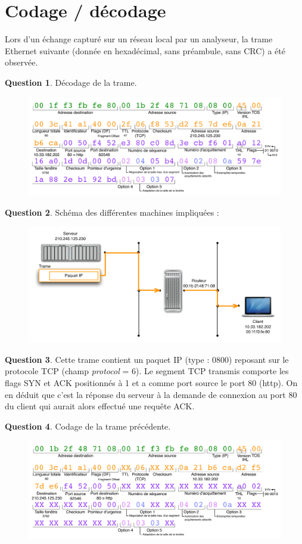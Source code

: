 \documentclass[11pt,english,french]{scrreprt}
\theoremstyle{remark}
\theoremstyle{definition}
\newtheorem{ques}{Question}[section]
\begin{document}
\section{Codage / décodage} %

Lors d'un échange capturé sur un réseau local par un analyseur, la trame Ethernet suivante (donnée en hexadécimal, sans préambule, sans CRC) a été observée.

\begin{ques}
	Décodage de la trame.
	\begin{figure}[h]
		\center
		\includegraphics[scale=.7]{Exam2009/trame}
	\end{figure}
\end{ques}

\begin{ques}
	Schéma des différentes machines impliquées : 
	\begin{figure}[h]
		\center
		\includegraphics[scale=1]{Exam2009/reseau-local1}
	\end{figure}
\end{ques}

\begin{ques}
	Cette trame contient un paquet IP (type : 0800) reposant sur le protocole TCP (champ \emph{protocol} = 6). Le segment TCP transmis comporte les flags SYN et ACK positionnés à 1 et a comme port source le port 80 (http). On en déduit que c'est la réponse du serveur à la demande de connexion au port 80 du client qui aurait alors effectué une requête ACK.
\end{ques}

\vspace{30pt}

\begin{ques}
	Codage de la trame précédente.
	\begin{figure}[h]
		\center
		\includegraphics[scale=.7]{Exam2009/trame2}
	\end{figure}
\end{ques}
\end{document}
